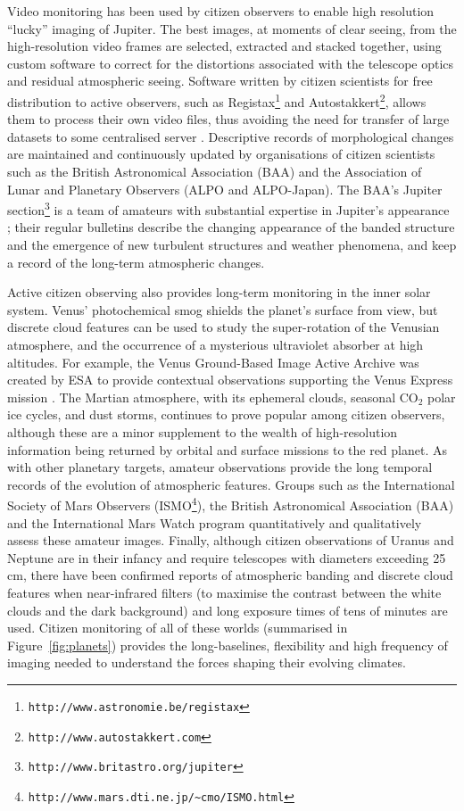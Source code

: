 \documentclass{ar2e}
\def\Fref#1{Figure~\ref{#1}\xspace}
\def\url#1{\texttt{#1}}
\begin{document}
Video monitoring has been used by citizen observers to enable high resolution
``lucky'' imaging of Jupiter. The best images, at moments of clear seeing, from
the high-resolution video frames are selected, extracted and stacked together,
using custom software to correct for the distortions associated with the
telescope optics and residual atmospheric seeing.  Software written by citizen
scientists for free distribution to active observers, such as
Registax\footnote{\url{http://www.astronomie.be/registax}} and
Autostakkert\footnote{\url{http://www.autostakkert.com}},  allows them to process their own
video files, thus avoiding the need for transfer of large datasets to some
centralised server \citep[see][for a thorough review]{14mousis_proam}. 
Descriptive records of morphological changes are maintained and continuously
updated by organisations of citizen scientists such as the British Astronomical
Association (BAA) and the Association of Lunar and Planetary Observers (ALPO and ALPO-Japan).
The BAA's Jupiter section\footnote{\url{http://www.britastro.org/jupiter}} is a
team of amateurs with substantial expertise in Jupiter's appearance
\citep{95rogers};  their regular bulletins describe the changing appearance of
the banded structure and the emergence of new turbulent structures and weather
phenomena, and keep a record of the long-term atmospheric changes.  

Active citizen observing also provides long-term monitoring in the inner solar
system.  Venus' photochemical smog shields the planet's surface from view, but
discrete cloud features can be used to study the super-rotation of the Venusian
atmosphere, and the occurrence of a mysterious ultraviolet absorber at high
altitudes.  For example, the Venus Ground-Based Image Active Archive was created
by ESA to provide contextual observations supporting the Venus Express mission
\citep{08barentsen}.  The Martian atmosphere, with its ephemeral clouds,
seasonal CO$_2$ polar ice cycles, and dust storms, continues to prove popular
among citizen observers, although these are a minor supplement to the wealth of
high-resolution information being returned by orbital and surface missions to
the red planet.  As with other planetary targets, amateur observations provide
the long temporal records of the evolution of atmospheric features.  Groups such
as the International Society of Mars Observers
(ISMO\footnote{\url{http://www.mars.dti.ne.jp/\textasciitilde cmo/ISMO.html}}), the British
Astronomical Association (BAA) and the International Mars Watch program
quantitatively and qualitatively assess these amateur images.  Finally, although
citizen observations of Uranus and Neptune are in their infancy and require
telescopes with diameters exceeding 25 cm, there have been confirmed reports of
atmospheric banding and discrete cloud features when near-infrared filters  (to
maximise the contrast between the white clouds and the dark background) and long
exposure times of tens of minutes are used.  Citizen monitoring of all of these
worlds (summarised in \Fref{fig:planets}) provides the long-baselines,
flexibility and high frequency of imaging needed to understand the forces
shaping their evolving climates.
\end{document}
